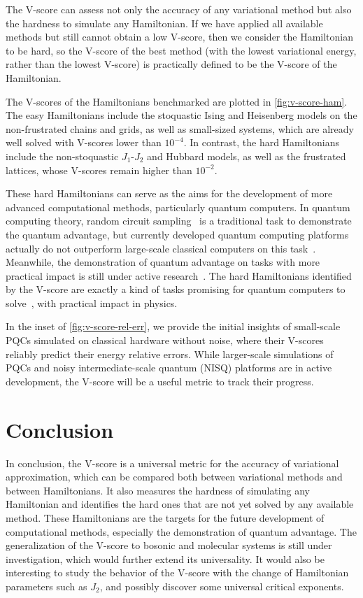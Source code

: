 The V-score can assess not only the accuracy of any variational method but also the hardness to simulate any Hamiltonian. If we have applied all available methods but still cannot obtain a low V-score, then we consider the Hamiltonian to be hard, so the V-score of the best method (with the lowest variational energy, rather than the lowest V-score) is practically defined to be the V-score of the Hamiltonian.

The V-scores of the Hamiltonians benchmarked are plotted in \cref{fig:v-score-ham}. The easy Hamiltonians include the stoquastic Ising and Heisenberg models on the non-frustrated chains and grids, as well as small-sized systems, which are already well solved with V-scores lower than $10^{-4}$. In contrast, the hard Hamiltonians include the non-stoquastic $J_1$-$J_2$ and Hubbard models, as well as the frustrated lattices, whose V-scores remain higher than $10^{-2}$.

These hard Hamiltonians can serve as the aims for the development of more advanced computational methods, particularly quantum computers. In quantum computing theory, random circuit sampling~\cite{lund2017quantum, boixo2018characterizing, arute2019quantum} is a traditional task to demonstrate the quantum advantage, but currently developed quantum computing platforms actually do not outperform large-scale classical computers on this task~\cite{pan2022solving, aharonov2023polynomial, gao2024limitations, zhao2024leapfrogging}. Meanwhile, the demonstration of quantum advantage on tasks with more practical impact is still under active research~\cite{daley2022practical}. The hard Hamiltonians identified by the V-score are exactly a kind of tasks promising for quantum computers to solve~\cite{feynman1982simulating}, with practical impact in physics.

In the inset of \cref{fig:v-score-rel-err}, we provide the initial insights of small-scale PQCs simulated on classical hardware without noise, where their V-scores reliably predict their energy relative errors. While larger-scale simulations of PQCs and noisy intermediate-scale quantum (NISQ) platforms are in active development, the V-score will be a useful metric to track their progress.

\section{Conclusion}

In conclusion, the V-score is a universal metric for the accuracy of variational approximation, which can be compared both between variational methods and between Hamiltonians. It also measures the hardness of simulating any Hamiltonian and identifies the hard ones that are not yet solved by any available method. These Hamiltonians are the targets for the future development of computational methods, especially the demonstration of quantum advantage. The generalization of the V-score to bosonic and molecular systems is still under investigation, which would further extend its universality. It would also be interesting to study the behavior of the V-score with the change of Hamiltonian parameters such as $J_2$, and possibly discover some universal critical exponents.

